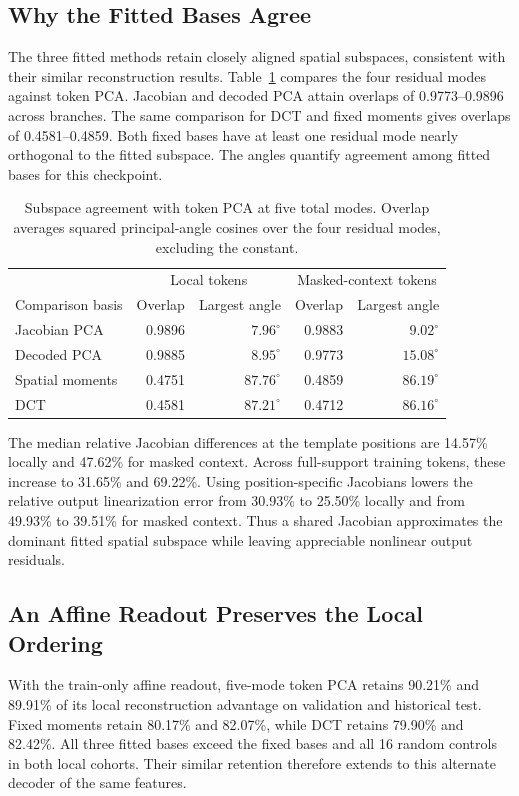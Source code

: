 \subsection{Why the Fitted Bases Agree}\label{sec:basis-similarity}
The three fitted methods retain closely aligned spatial subspaces, consistent with their similar reconstruction results. Table~\ref{tab:angles} compares the four residual modes against token PCA. Jacobian and decoded PCA attain overlaps of 0.9773--0.9896 across branches. The same comparison for DCT and fixed moments gives overlaps of 0.4581--0.4859. Both fixed bases have at least one residual mode nearly orthogonal to the fitted subspace. The angles quantify agreement among fitted bases for this checkpoint.

\begin{table}[t]
\caption{Subspace agreement with token PCA at five total modes. Overlap averages squared principal-angle cosines over the four residual modes, excluding the constant.}\label{tab:angles}
\centering\small
\begin{tabular}{lrrrr}\toprule
 & \multicolumn{2}{c}{Local tokens} & \multicolumn{2}{c}{Masked-context tokens}\\
Comparison basis & Overlap & Largest angle & Overlap & Largest angle\\\midrule
Jacobian PCA & 0.9896 & $7.96^\circ$ & 0.9883 & $9.02^\circ$\\
Decoded PCA & 0.9885 & $8.95^\circ$ & 0.9773 & $15.08^\circ$\\
Spatial moments & 0.4751 & $87.76^\circ$ & 0.4859 & $86.19^\circ$\\
DCT & 0.4581 & $87.21^\circ$ & 0.4712 & $86.16^\circ$\\\bottomrule
\end{tabular}
\end{table}

The median relative Jacobian differences at the template positions are 14.57\% locally and 47.62\% for masked context. Across full-support training tokens, these increase to 31.65\% and 69.22\%. Using position-specific Jacobians lowers the relative output linearization error from 30.93\% to 25.50\% locally and from 49.93\% to 39.51\% for masked context. Thus a shared Jacobian approximates the dominant fitted spatial subspace while leaving appreciable nonlinear output residuals.

\subsection{An Affine Readout Preserves the Local Ordering}
With the train-only affine readout, five-mode token PCA retains 90.21\% and 89.91\% of its local reconstruction advantage on validation and historical test. Fixed moments retain 80.17\% and 82.07\%, while DCT retains 79.90\% and 82.42\%. All three fitted bases exceed the fixed bases and all 16 random controls in both local cohorts. Their similar retention therefore extends to this alternate decoder of the same features.

